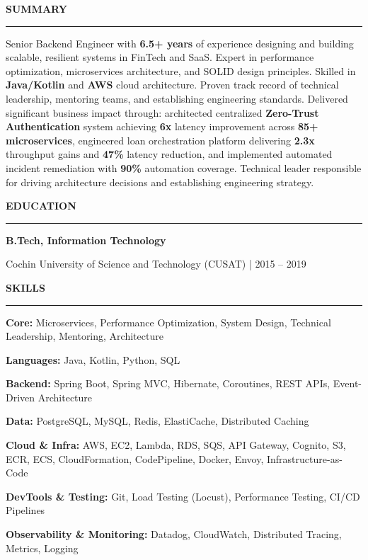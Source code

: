 \documentclass[a4paper,11pt]{article}
\newcommand{\cvsection}[1]{%
  \vspace{1pt}
  {\color{dark}\normalsize\bfseries\MakeUppercase{#1}}\par
  \vspace{-5pt}
  {\color{dark}\rule{\linewidth}{1.1pt}}\par
  \vspace{1pt}
}
\begin{document}
\begin{minipage}[t]{0.34\textwidth}

\cvsection{Summary}
{\small\sloppy
Senior Backend Engineer with \textbf{6.5+ years} of experience designing and building scalable, resilient systems in FinTech and SaaS. Expert in performance optimization, microservices architecture, and SOLID design principles. Skilled in \textbf{Java/Kotlin} and \textbf{AWS} cloud architecture. Proven track record of technical leadership, mentoring teams, and establishing engineering standards. Delivered significant business impact through: architected centralized \textbf{Zero-Trust Authentication} system achieving \textbf{6x} latency improvement across \textbf{85+ microservices}, engineered loan orchestration platform delivering \textbf{2.3x} throughput gains and \textbf{47\%} latency reduction, and implemented automated incident remediation with \textbf{90\%} automation coverage. Technical leader responsible for driving architecture decisions and establishing engineering strategy.
\par}

\vspace{3pt}
\cvsection{Education}
{\bfseries B.Tech, Information Technology}\par
{\color{accent}Cochin University of Science and Technology (CUSAT) | 2015 -- 2019}\par

\vspace{3pt}
\cvsection{Skills}
{\small
\textbf{Core:} Microservices, Performance Optimization, System Design, Technical Leadership, Mentoring, Architecture \par
\vspace{0.5pt}
\textbf{Languages:} Java, Kotlin, Python, SQL \par
\vspace{0.5pt}
\textbf{Backend:} Spring Boot, Spring MVC, Hibernate, Coroutines, REST APIs, Event-Driven Architecture \par
\vspace{0.5pt}
\textbf{Data:} PostgreSQL, MySQL, Redis, ElastiCache, Distributed Caching \par
\vspace{0.5pt}
\textbf{Cloud \& Infra:} AWS, EC2, Lambda, RDS, SQS, API Gateway, Cognito, S3, ECR, ECS, CloudFormation, CodePipeline, Docker, Envoy, Infrastructure-as-Code \par
\vspace{0.5pt}
\textbf{DevTools \& Testing:} Git, Load Testing (Locust), Performance Testing, CI/CD Pipelines \par
\vspace{0.5pt}
\textbf{Observability \& Monitoring:} Datadog, CloudWatch, Distributed Tracing, Metrics, Logging
}


\end{minipage}
\end{document}
